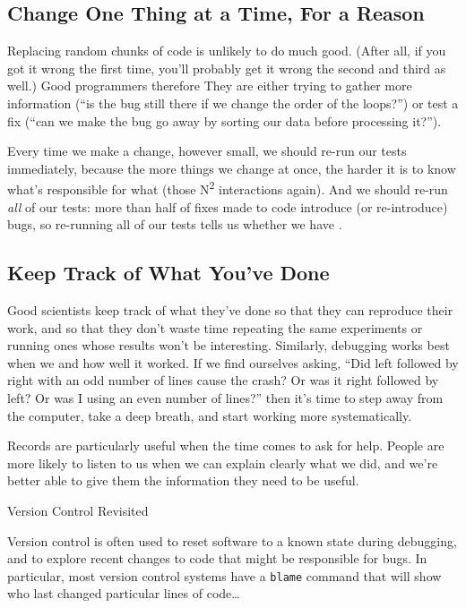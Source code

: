 \subsection*{Change One Thing at a Time, For a Reason}

Replacing random chunks of code is unlikely to do much good. (After all,
if you got it wrong the first time, you'll probably get it wrong the
second and third as well.) Good programmers therefore
 They are either trying to gather more information
(``is the bug still there if we change the order of the loops?'') or
test a fix (``can we make the bug go away by sorting our data before
processing it?'').

Every time we make a change, however small, we should re-run our tests
immediately, because the more things we change at once, the harder it is
to know what's responsible for what (those N\textsuperscript{2}
interactions again). And we should re-run \emph{all} of our tests: more
than half of fixes made to code introduce (or re-introduce) bugs, so
re-running all of our tests tells us whether we have
.

\subsection*{Keep Track of What You've Done}

Good scientists keep track of what they've done so that they can
reproduce their work, and so that they don't waste time repeating the
same experiments or running ones whose results won't be interesting.
Similarly, debugging works best when we
 and how well it worked. If we find ourselves asking,
``Did left followed by right with an odd number of lines cause the
crash? Or was it right followed by left? Or was I using an even number
of lines?'' then it's time to step away from the computer, take a deep
breath, and start working more systematically.

Records are particularly useful when the time comes to ask for help.
People are more likely to listen to us when we can explain clearly what
we did, and we're better able to give them the information they need to
be useful.

\begin{swcbox}{Version Control Revisited}

Version control is often used to reset software to a known state during
debugging, and to explore recent changes to code that might be
responsible for bugs. In particular, most version control systems have a
\texttt{blame} command that will show who last changed particular lines
of code\ldots{}

\end{swcbox}

